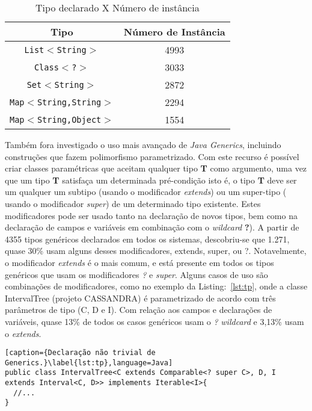 \begin{table}[ht]
	\centering
	\caption{Tipo declarado X Número de instância}
	\begin{tabular}{cc}
		\hline
		Tipo & Número de Instância\\ 
		\hline \hline
		\texttt{List$<$String$>$} & 4993 \\ 
		\texttt{Class$<$?$>$} & 3033 \\ 
		\texttt{Set$<$String$>$} & 2872 \\ 
		\texttt{Map$<$String,String$>$} & 2294 \\ 
		\texttt{Map$ < $String,Object$>$} & 1554 \\ \hline
	\end{tabular}
	\label{tab:tipoXnumeroInstancia} %
\end{table}

Também fora investigado o uso mais avançado de \textit{Java Generics}, incluindo construções que fazem polimorfismo parametrizado. Com este recurso é possível criar classes paramétricas que aceitam qualquer tipo \textbf{T} como argumento, uma vez que um tipo \textbf{T} satisfaça um determinada pré-condição isto é, o tipo \textbf{T} deve ser um qualquer um subtipo (usando o modificador \textit{extends}) ou um super-tipo ( usando o modificador \textit{super}) de um determinado tipo existente. Estes modificadores pode ser usado tanto na declaração de novos tipos, bem como na declaração de campos e variáveis em combinação com o \textit{wildcard} \textbf{?}). A partir de 4355 tipos genéricos declarados em todos os sistemas, descobriu-se que 1.271, quase 30\% usam alguns desses modificadores, extends, super, ou ?. Notavelmente, o modificador \textit{extends} é o mais comum, e está presente em todos os tipos genéricos que usam os modificadores \textit{?} e \textit{super}. Alguns casos de uso são combinações de modificadores, como no exemplo da Listing:~\ref{lst:tp}, onde a classe IntervalTree (projeto CASSANDRA) é parametrizado de acordo com três parâmetros de tipo (C, D e I). Com relação aos campos e declarações de variáveis, quase 13\% de todos os casos genéricos usam o \textit{?} \textit{wildcard} e 3,13\% usam o \textit{extends}.

\begin{lstlisting}[caption={Declaração não trivial de Generics.}\label{lst:tp},language=Java] 
public class IntervalTree<C extends Comparable<? super C>, D, I extends Interval<C, D>> implements Iterable<I>{
  //...
}
\end{lstlisting}



